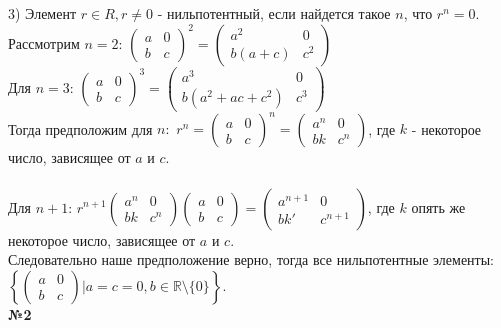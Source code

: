 \documentclass[a4paper, 12pt]{article}
\begin{document}
	3) Элемент $r \in R, r \neq 0$ - нильпотентный, если найдется такое $n$, что $r^n = 0$. \\
	Рассмотрим $n = 2$: $\begin{pmatrix} a & 0 \\ b & c \end{pmatrix}^2 = \begin{pmatrix} a^2 & 0 \\ b(a + c) & c^2 \end{pmatrix}$ \\
	Для $n = 3$: $\begin{pmatrix} a & 0 \\ b & c \end{pmatrix}^3 = \begin{pmatrix} a^3 & 0 \\ b(a^2 + ac + c^2) & c^3 \end{pmatrix}$ \\
	Тогда предположим для $n:$ $r^n = \begin{pmatrix} a & 0 \\ b & c \end{pmatrix}^n = \begin{pmatrix} a^n & 0 \\ bk & c^n \end{pmatrix}$, где $k$ - некоторое число, зависящее от $a$ и $c$. \\\\
	Для $n+1$: $r^{n + 1} \begin{pmatrix} a^n & 0 \\ bk & c^n \end{pmatrix} \begin{pmatrix} a & 0 \\ b & c \end{pmatrix} = \begin{pmatrix} a^{n + 1} & 0 \\ bk' & c^{n + 1} \end{pmatrix}$, где $k$ опять же некоторое число, зависящее от $a$ и $c$. \\
	Следовательно наше предположение верно, тогда все нильпотентные элементы: $\left\{ \begin{pmatrix} a & 0 \\ b & c \end{pmatrix} \bigg| a = c = 0, b \in \mathbb R \setminus \{0\} \right\}$. \\
	
	\textbf{№2} \\
	
\end{document}
